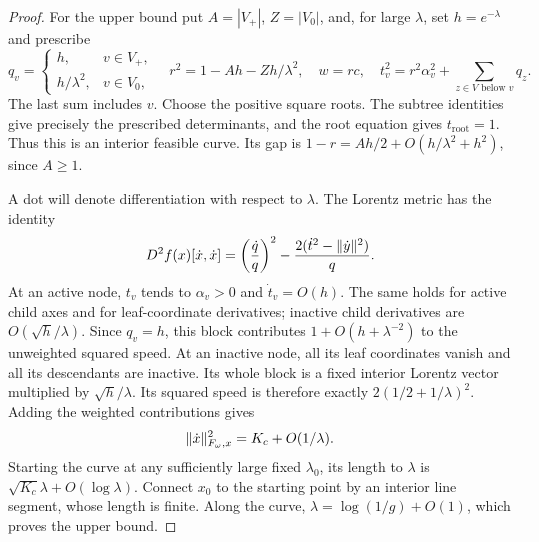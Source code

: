 \begin{proof}
For the upper bound put $A=|V_+|$, $Z=|V_0|$, and, for large
$\lambda$, set $h=e^{-\lambda}$ and prescribe
\begin{equation}\label{eq:tree-distance-curve}
 q_v=\begin{cases}h,&v\in V_+,\\h/\lambda^2,&v\in V_0,\end{cases}
 \quad r^2=1-Ah-Zh/\lambda^2,
 \quad w=rc,\quad
 t_v^2=r^2\alpha_v^2+\sum_{z\in V\text{ below }v}q_z.
\end{equation}
The last sum includes $v$.  Choose the positive square roots.  The subtree
identities give precisely the prescribed determinants, and the root
equation gives $t_{\mathrm{root}}=1$.  Thus this is an interior feasible curve.
Its gap is $1-r=Ah/2+O(h/\lambda^2+h^2)$, since $A\geq1$.

A dot will denote differentiation with respect to $\lambda$.
The Lorentz metric has the identity
\begin{equation}\label{eq:tree-speed-identity}
 D^2f(x)[\dot x,\dot x]
 =\left(\frac{\dot q}{q}\right)^2
       -\frac{2(\dot t^2-\lVert \dot y\rVert^2)}q.
\end{equation}
At an active node, $t_v$ tends to $\alpha_v>0$ and
$\dot t_v=O(h)$.  The same holds for active child axes and for
leaf-coordinate derivatives; inactive child derivatives are
$O(\sqrt h/\lambda)$.  Since $q_v=h$, this block contributes
$1+O(h+\lambda^{-2})$ to the unweighted squared speed.
At an inactive node, all its leaf coordinates vanish and all its
descendants are inactive.  Its whole block is a fixed interior Lorentz
vector multiplied by $\sqrt h/\lambda$.  Its squared speed is therefore
exactly $2(1/2+1/\lambda)^2$.  Adding the weighted contributions gives
\[
 \lVert \dot x\rVert_{F_\omega,x}^2=K_c+O(1/\lambda).
\]
Starting the curve at any sufficiently large fixed $\lambda_0$, its
length to $\lambda$ is $\sqrt{K_c}\lambda+O(\log\lambda)$.
Connect $x_0$ to the starting point by an interior line segment, whose
length is finite.  Along the curve,
$\lambda=\log(1/g)+O(1)$, which proves the upper bound.
\end{proof}


